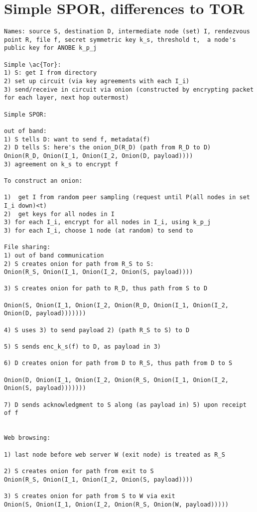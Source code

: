 \onecolumn
\section{Simple SPOR, differences to TOR}
\begin{verbatim}
Names: source S, destination D, intermediate node (set) I, rendezvous point R, file f, secret symmetric key k_s, threshold t,  a node's public key for ANOBE k_p_j

Simple \ac{Tor}:
1) S: get I from directory
2) set up circuit (via key agreements with each I_i)
3) send/receive in circuit via onion (constructed by encrypting packet for each layer, next hop outermost)

Simple SPOR:

out of band:
1) S tells D: want to send f, metadata(f)
2) D tells S: here's the onion_D(R_D) (path from R_D to D)
Onion(R_D, Onion(I_1, Onion(I_2, Onion(D, payload))))
3) agreement on k_s to encrypt f

To construct an onion:

1)  get I from random peer sampling (request until P(all nodes in set I_i down)<t)
2)  get keys for all nodes in I
3) for each I_i, encrypt for all nodes in I_i, using k_p_j
3) for each I_i, choose 1 node (at random) to send to

File sharing:
1) out of band communication
2) S creates onion for path from R_S to S:
Onion(R_S, Onion(I_1, Onion(I_2, Onion(S, payload))))

3) S creates onion for path to R_D, thus path from S to D

Onion(S, Onion(I_1, Onion(I_2, Onion(R_D, Onion(I_1, Onion(I_2, Onion(D, payload)))))))

4) S uses 3) to send payload 2) (path R_S to S) to D 

5) S sends enc_k_s(f) to D, as payload in 3)

6) D creates onion for path from D to R_S, thus path from D to S

Onion(D, Onion(I_1, Onion(I_2, Onion(R_S, Onion(I_1, Onion(I_2, Onion(S, payload)))))))

7) D sends acknowledgment to S along (as payload in) 5) upon receipt of f


Web browsing:

1) last node before web server W (exit node) is treated as R_S

2) S creates onion for path from exit to S
Onion(R_S, Onion(I_1, Onion(I_2, Onion(S, payload))))

3) S creates onion for path from S to W via exit
Onion(S, Onion(I_1, Onion(I_2, Onion(R_S, Onion(W, payload)))))


\end{verbatim}
